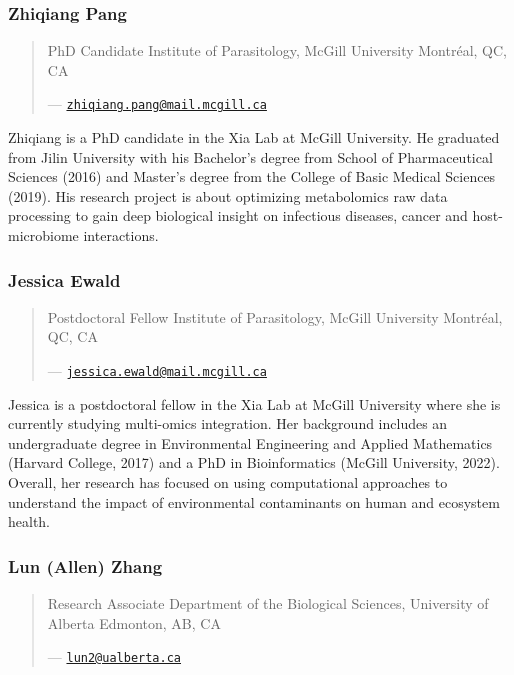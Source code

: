 \documentclass[
]{book}
\begin{document}
\subsubsection{Zhiqiang Pang}\label{zhiqiang-pang}

\begin{quote}
PhD Candidate
Institute of Parasitology, McGill University
Montréal, QC, CA

--- \href{mailto:zhiqiang.pang@mail.mcgill.ca}{\nolinkurl{zhiqiang.pang@mail.mcgill.ca}}
\end{quote}

Zhiqiang is a PhD candidate in the Xia Lab at McGill University.
He graduated from Jilin University with his Bachelor's degree from
School of Pharmaceutical Sciences (2016) and Master's degree from the College of Basic
Medical Sciences (2019). His research project is about optimizing metabolomics raw data
processing to gain deep biological insight on infectious diseases, cancer and host-microbiome
interactions.

\subsubsection{Jessica Ewald}\label{jessica-ewald}

\begin{quote}
Postdoctoral Fellow
Institute of Parasitology, McGill University
Montréal, QC, CA

--- \href{mailto:jessica.ewald@mail.mcgill.ca}{\nolinkurl{jessica.ewald@mail.mcgill.ca}}
\end{quote}

Jessica is a postdoctoral fellow in the Xia Lab at McGill University
where she is currently studying multi-omics integration. Her
background includes an undergraduate degree in Environmental
Engineering and Applied Mathematics (Harvard College, 2017) and
a PhD in Bioinformatics (McGill University, 2022). Overall, her research has focused on using
computational approaches to understand the impact of environmental contaminants on human
and ecosystem health.

\subsubsection{Lun (Allen) Zhang}\label{lun-allen-zhang}

\begin{quote}
Research Associate
Department of the Biological Sciences, University of Alberta
Edmonton, AB, CA

--- \href{mailto:lun2@ualberta.ca}{\nolinkurl{lun2@ualberta.ca}}
\end{quote}
\end{document}

